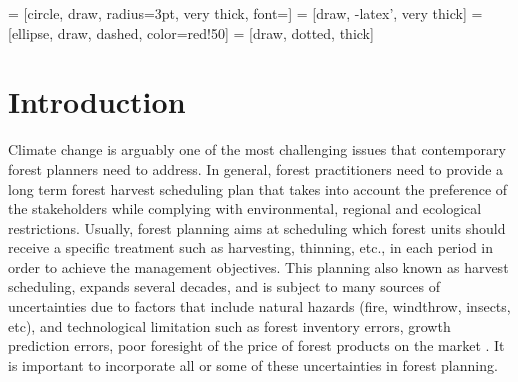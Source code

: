 \documentclass[forests,article,submit,moreauthors,pdftex]{Definitions/mdpi}
\begin{document}
 = [circle, draw,  radius=3pt, very thick, font=\scriptsize]
 = [draw, -latex', very thick]
 = [ellipse, draw, dashed, color=red!50]
 = [draw, dotted, thick]

\section{Introduction}
Climate change is arguably one of the most challenging issues that contemporary forest planners need to address. In general, forest practitioners need to provide a long term forest  harvest scheduling plan that takes into account the preference of the stakeholders while  complying with environmental, regional and ecological restrictions. Usually, forest planning aims at scheduling which forest units should receive a specific treatment such as harvesting, thinning, etc., in each period in order to achieve the management objectives. This  planning also known as harvest scheduling,  expands several decades, and is subject to many sources of uncertainties due to factors that include natural hazards (fire, windthrow, insects, etc), and  technological limitation such as forest inventory errors, growth prediction errors, poor foresight of the price of forest products on the market \citep{Makinen2013, Ross2016}. It is important to incorporate all or some of these uncertainties in forest planning.
\end{document}

